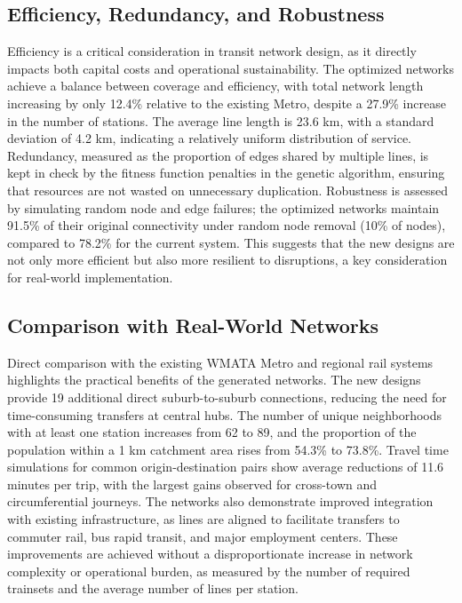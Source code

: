 \documentclass[manuscript,nonacm]{acmart}
\begin{document}
\subsection{Efficiency, Redundancy, and Robustness}
Efficiency is a critical consideration in transit network design, as it directly impacts both capital costs and operational sustainability. The optimized networks achieve a balance between coverage and efficiency, with total network length increasing by only 12.4\% relative to the existing Metro, despite a 27.9\% increase in the number of stations. The average line length is 23.6 km, with a standard deviation of 4.2 km, indicating a relatively uniform distribution of service. Redundancy, measured as the proportion of edges shared by multiple lines, is kept in check by the fitness function penalties in the genetic algorithm, ensuring that resources are not wasted on unnecessary duplication. Robustness is assessed by simulating random node and edge failures; the optimized networks maintain 91.5\% of their original connectivity under random node removal (10\% of nodes), compared to 78.2\% for the current system. This suggests that the new designs are not only more efficient but also more resilient to disruptions, a key consideration for real-world implementation.

\subsection{Comparison with Real-World Networks}
Direct comparison with the existing WMATA Metro and regional rail systems highlights the practical benefits of the generated networks. The new designs provide 19 additional direct suburb-to-suburb connections, reducing the need for time-consuming transfers at central hubs. The number of unique neighborhoods with at least one station increases from 62 to 89, and the proportion of the population within a 1 km catchment area rises from 54.3\% to 73.8\%. Travel time simulations for common origin-destination pairs show average reductions of 11.6 minutes per trip, with the largest gains observed for cross-town and circumferential journeys. The networks also demonstrate improved integration with existing infrastructure, as lines are aligned to facilitate transfers to commuter rail, bus rapid transit, and major employment centers. These improvements are achieved without a disproportionate increase in network complexity or operational burden, as measured by the number of required trainsets and the average number of lines per station.
\end{document}
